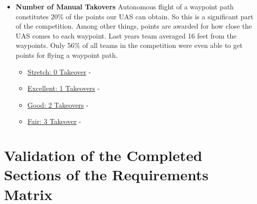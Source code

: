 \documentclass[]{auvsi_doc}
\begin{document}
\begin{itemize}
\item \textbf{Number of Manual Takovers} Autonomous flight of a waypoint path constitutes 20\% of the points our UAS can obtain. So this is a significant part of the competition. Among other things, points are awarded for how close the UAS comes to each waypoint. Last years team averaged 16 feet from the waypoints. Only 56\% of all teams in the competition were even able to get points for flying a waypoint path.
	\begin{itemize}
	\item \underline{Stretch: 0 Takeover} - 
	\item \underline{Excellent: 1 Takeovers} -  
	\item \underline{Good: 2 Takeovers} -  
	\item  \underline{Fair: 3 Takeover} -  
	\end{itemize}

\end{itemize}


\section{Validation of the Completed Sections of the Requirements Matrix}
\end{document}
